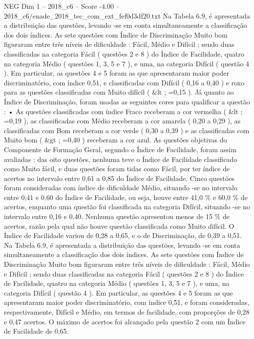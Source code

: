 \begin{textsample}{NEG Dim 1 – 2018\_c6 – Score -4.00 – 2018\_c6/enade\_2018\_tec\_com\_ext\_fef0d3df20.txt}
Na Tabela 6.9, é apresentada a distribuição das questões, levando -se em conta simultaneamente a classificação dos dois índices.
As sete questões com Índice de Discriminação Muito bom figuraram entre três níveis de dificuldade : Fácil, Médio e Difícil ; sendo duas classificadas na categoria Fácil ( questões 2 e 8 ) do Índice de Facilidade, quatro na categoria Médio ( questões 1, 3, 5 e 7 ), e uma, na categoria Difícil ( questão 4 ).
Em particular, as questões 4 e 5 foram as que apresentaram maior poder discriminatório, com índice 0,51, e classificadas com Difícil ( 0,16 a 0,40 ) e roxo para as questões classificadas com Muito difícil ( \&lt ; =0,15 ).
Já quanto ao Índice de Discriminação, foram usadas as seguintes cores para qualificar a questão : • As questões classificadas com índice Fraco receberam a cor vermelha ( \&lt ; =0,19 ), as classificadas com Médio receberam a cor amarela ( 0,20 a 0,29 ), as classificadas com Bom receberam a cor verde ( 0,30 a 0,39 ) e as classificadas com Muito bom ( \&gt ; =0,40 ) receberam a cor azul.
As questões objetivas do Componente de Formação Geral, segundo o Índice de Facilidade, foram assim avaliadas : das oito questões, nenhuma teve o Índice de Facilidade classificado como Muito fácil, e duas questões foram tidas como Fácil, por ter índice de acertos no intervalo entre 0,61 a 0,85 do Índice de Facilidade.
Cinco questões foram consideradas com índice de dificuldade Médio, situando -se no intervalo entre 0,41 e 0,60 do Índice de Facilidade, ou seja, houve entre 41,0 \% e 60,0 \% de acertos, enquanto uma questão foi classificada na categoria Difícil, situando -se no intervalo entre 0,16 e 0,40.
Nenhuma questão apresentou menos de 15 \% de acertos, razão pela qual não houve questão classificada como Muito difícil.
O Índice de Facilidade variou de 0,28 a 0,65, e o de Discriminação, de 0,39 a 0,51.
Na Tabela 6.9, é apresentada a distribuição das questões, levando -se em conta simultaneamente a classificação dos dois índices.
As sete questões com Índice de Discriminação Muito bom figuraram entre três níveis de dificuldade : Fácil, Médio e Difícil ; sendo duas classificadas na categoria Fácil ( questões 2 e 8 ) do Índice de Facilidade, quatro na categoria Médio ( questões 1, 3, 5 e 7 ), e uma, na categoria Difícil ( questão 4 ).
Em particular, as questões 4 e 5 foram as que apresentaram maior poder discriminatório, com índice 0,51, e foram consideradas, respectivamente, Difícil e Médio, em termos de facilidade, com proporções de 0,28 e 0,47 acertos.
O máximo de acertos foi alcançado pela questão 2 com um Índice de Facilidade de 0,65.

\end{textsample}
